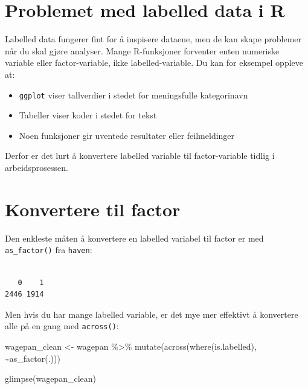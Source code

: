 \documentclass[
  norsk,
  letterpaper,
  DIV=11,
  numbers=noendperiod]{scrreprt}
\newenvironment{Shaded}{\begin{snugshade}}{\end{snugshade}}
\newcommand{\AttributeTok}[1]{\textcolor[rgb]{0.40,0.45,0.13}{#1}}
\newcommand{\FunctionTok}[1]{\textcolor[rgb]{0.28,0.35,0.67}{#1}}
\newcommand{\NormalTok}[1]{\textcolor[rgb]{0.00,0.23,0.31}{#1}}
\newcommand{\OtherTok}[1]{\textcolor[rgb]{0.00,0.23,0.31}{#1}}
\newcommand{\SpecialCharTok}[1]{\textcolor[rgb]{0.37,0.37,0.37}{#1}}
\providecommand{\tightlist}{%
  \setlength{\itemsep}{0pt}\setlength{\parskip}{0pt}}
\theoremstyle{definition}
\theoremstyle{remark}
\begin{document}
\section{Problemet med labelled data i
R}\label{problemet-med-labelled-data-i-r}

Labelled data fungerer fint for å inspisere dataene, men de kan skape
problemer når du skal gjøre analyser. Mange R-funksjoner forventer enten
numeriske variable eller factor-variable, ikke labelled-variable. Du kan
for eksempel oppleve at:

\begin{itemize}
\tightlist
\item
  \texttt{ggplot} viser tallverdier i stedet for meningsfulle
  kategorinavn
\item
  Tabeller viser koder i stedet for tekst
\item
  Noen funksjoner gir uventede resultater eller feilmeldinger
\end{itemize}

Derfor er det lurt å konvertere labelled variable til factor-variable
tidlig i arbeidsprosessen.

\section{Konvertere til factor}\label{konvertere-til-factor}

Den enkleste måten å konvertere en labelled variabel til factor er med
\texttt{as\_factor()} fra \texttt{haven}:

\begin{Shaded}
\end{Shaded}

\begin{verbatim}

   0    1 
2446 1914 
\end{verbatim}

Men hvis du har mange labelled variable, er det mye mer effektivt å
konvertere alle på en gang med \texttt{across()}:

\begin{Shaded}
\begin{Highlighting}[]
\NormalTok{wagepan\_clean }\OtherTok{\textless{}{-}}\NormalTok{ wagepan }\SpecialCharTok{\%\textgreater{}\%}
  \FunctionTok{mutate}\NormalTok{(}\FunctionTok{across}\NormalTok{(}\FunctionTok{where}\NormalTok{(is.labelled), }\SpecialCharTok{\textasciitilde{}}\FunctionTok{as\_factor}\NormalTok{(.)))}

\FunctionTok{glimpse}\NormalTok{(wagepan\_clean)}
\end{Highlighting}
\end{Shaded}
\end{document}
